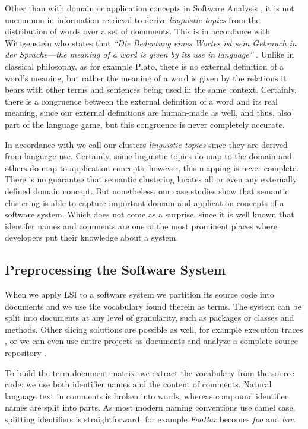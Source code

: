 Other than with domain or application concepts in Software Analysis \cite{Bigg93a}, it is not uncommon in information retrieval to derive \emph{linguistic topics} from the distribution of words over a set of documents. This is in accordance with Wittgenstein who states that \emph{``Die Bedeutung eines Wortes ist sein Gebrauch in der Sprache---the meaning of a word is given by its use in language''} \cite{Witt53a}. Unlike in classical philosophy, as for example Plato, there is no external definition of a word's meaning, but rather the meaning of a word is given by the relations it bears with other terms and sentences being used in the same context. Certainly, there is a congruence between the external definition of a word and its real meaning, since our external definitions are human-made as well, and thus, also part of the language game, but this congruence is never completely accurate.

In accordance with \cite{Bigg89c} we call our clusters \emph{linguistic topics} since they are derived from language use. Certainly, some linguistic topics do map to the domain and others do map to application concepts, however, this mapping is never complete. There is no guarantee that semantic clustering locates all or even any externally defined domain concept. But nonetheless, our case studies show that semantic clustering is able to capture important domain and application concepts of a software system. Which does not come as a surprise, since it is well known that identifer names and comments are one of the most prominent places where developers put their knowledge about a system.

\subsection{Preprocessing the Software System}\label{sec:parsing}

When we apply LSI to a software system we partition its source code into documents and we use the vocabulary found therein as terms. The system can be split into documents at any level of granularity, such as packages or classes and methods. Other slicing solutions are possible as well, for example execution traces \cite{Kuhn05b}, or we can even use entire projects as documents and analyze a complete source repository \cite{Kawa04a}.

To build the term-document-matrix, we extract the vocabulary from the source code: we use both identifier names and the content of comments. Natural language text in comments is broken into words, whereas compound identifier names are split into parts. As most modern naming conventions use camel case, splitting identifiers is straightforward: for example \emph{FooBar} becomes \emph{foo} and \emph{bar}.

